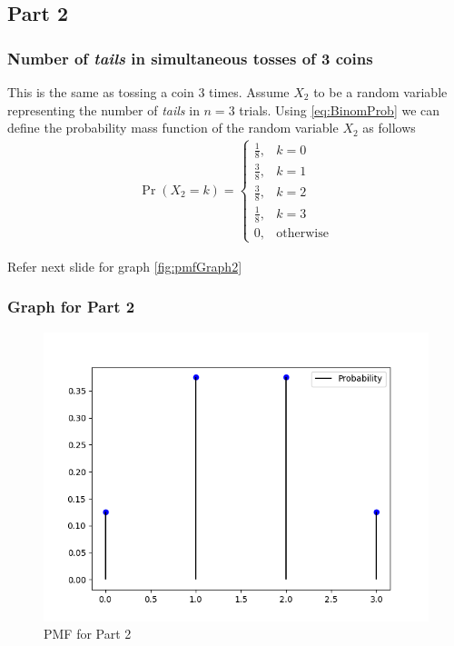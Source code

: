 \documentclass{beamer}
\begin{document}
\subsection{Part 2}
\begin{frame}
  \frametitle{Number of \emph{tails} in simultaneous tosses of 3 coins}
  This is the same as tossing a coin 3 times. Assume $X_2$ to be a random variable representing the number of \emph{tails} in $n = 3$ trials. Using
  \eqref{eq:BinomProb}
  we can define the probability mass function of the random variable $X_2$ as follows
  \begin{align}
    \Pr(X_2 = k) = 
    \begin{cases}
      \frac{1}{8}, & k = 0 \\
      \frac{3}{8}, & k = 1 \\
      \frac{3}{8}, & k = 2 \\
      \frac{1}{8}, & k = 3 \\
      0, & \text{otherwise}
    \end{cases}
    \label{eq:Pmf2}
  \end{align}

  Refer next slide for graph
  \eqref{fig:pmfGraph2}
\end{frame}

\begin{frame}
  \frametitle{Graph for Part 2}
  \begin{figure}[!ht]
    \centering
    \includegraphics[width=0.5\columnwidth]{../Figures/coin2.png}
    \caption{PMF for Part 2}
    \label{fig:pmfGraph2}
  \end{figure}
\end{frame}

\end{document}
